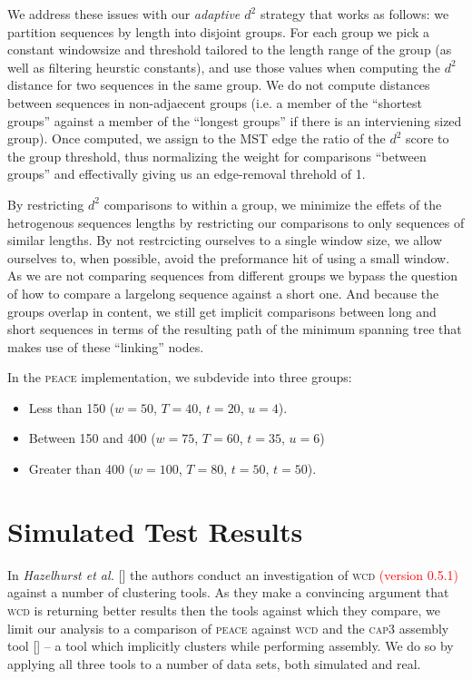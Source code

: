 \documentclass[a4paper,12pt]{article}
\newcommand{\mc}[1]{\textcolor{red}{#1}}
\begin{document}
\begin{appendix}
We address these issues with our {\it adaptive $d^2$} strategy that
works as follows: we partition sequences by length into disjoint groups.  For each
group we pick a constant windowsize and threshold tailored to the
length range of the group (as well as filtering heurstic constants),
and use those values when computing the $d^2$ distance for two
sequences in the same group.  We do not compute distances between
sequences in non-adjaecent groups (i.e. a member of the ``shortest
groups'' against a member of the ``longest groups'' if there is an
interviening sized group).  Once computed, we assign to the MST
edge the ratio of the $d^2$ score to the group threshold, thus
normalizing the weight for comparisons ``between groups'' and
effectivally giving us an edge-removal threhold of 1.

By restricting $d^2$ comparisons to within a group, we minimize the
effets of the hetrogenous sequences lengths by restricting our
comparisons to only sequences of similar lengths.  By not restrcicting
ourselves to a single window size, we allow ourselves to, when possible, avoid the
preformance hit of using a small window.  As we are not comparing
sequences from different groups we bypass the question of how to
compare a largelong sequence against a short one.  And because the
groups overlap in content, we still get implicit comparisons between
long and short sequences in terms of the resulting path of the minimum
spanning tree that makes use of these ``linking'' nodes.

In the \textsc{peace} implementation, we subdevide into three groups:
\begin{itemize}
\item Less than 150 ($w=50$, $T=40$, $t=20$, $u=4$).
\item Between 150 and 400 ($w=75$, $T=60$, $t=35$, $u=6$)
\item Greater than 400 ($w=100$, $T=80$, $t=50$, $t=50$).
\end{itemize}




\section{Simulated Test Results}

In {\it Hazelhurst et al.} [\cite{Hazelhurst08a}] the authors conduct
an investigation of \textsc{wcd} \mc{(version 0.5.1)} against a number of clustering
tools.  As they make a convincing argument that \textsc{wcd} is returning
better results then the tools against which they compare, we limit our
analysis to a comparison of \textsc{peace} against \textsc{wcd} and the \textsc{cap3} assembly
tool [\cite{Huang99}] -- a tool which implicitly clusters while
performing assembly.  We do so by applying all three tools to a number
of data sets, both simulated and real.


\end{appendix}
\end{document}
